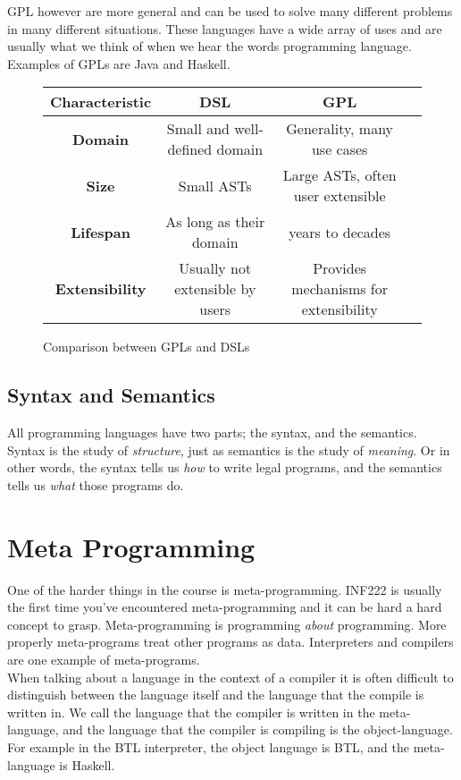     \Gls{GPL} however are more general and can be used to solve many different problems in many different situations.
    These languages have a wide array
    of uses and are usually what we think of when we hear the words programming language. Examples of GPLs are Java and Haskell.\\
    
    \begin{figure*}[!h]
        \centering
        \begin{tabular}{|c|c|c|c|}
            \hline
            \textbf{Characteristic} &\textbf{DSL } &\textbf{GPL}\\
            \hline
            \textbf{Domain} & Small and well-defined domain & Generality, many use cases\\
            \hline
            \textbf{Size} &Small ASTs & Large ASTs, often user extensible\\
            \hline
            \textbf{Lifespan} &As long as their domain &years to decades\\
            \hline
            \textbf{Extensibility} &Usually not extensible by users & Provides mechanisms for extensibility\\
            \hline
        \end{tabular}%
        \caption{Comparison between GPLs and DSLs}
    \end{figure*}%



    \subsection*{Syntax and Semantics}
    All programming languages have two parts; the \gls{syntax}, and the \gls{semantics}.\\
    Syntax is the study of \textit{structure}, just as semantics is the study of \textit{meaning}. 
    Or in other words, the syntax tells us \textit{how} to write legal programs, and the semantics tells us \textit{what} those programs do. 

    \section{Meta Programming}
    One of the harder things in the course is \gls{meta-programming}. INF222 is usually the first time you've encountered meta-programming and it can be hard a hard concept to grasp. 
    Meta-programming is programming \textit{about} programming. More properly meta-programs treat other programs as data. 
    Interpreters and compilers are one example of meta-programs.\\
    When talking about a language in the context of a compiler it is often difficult to distinguish between the language itself and the language that the compile is written in.
    We call the language that the compiler is written in the \gls{meta-language}, and the language that the compiler is compiling is the \gls{object-language}.\\
    For example in the BTL interpreter, the object language is BTL, and the meta-language is Haskell.\\

